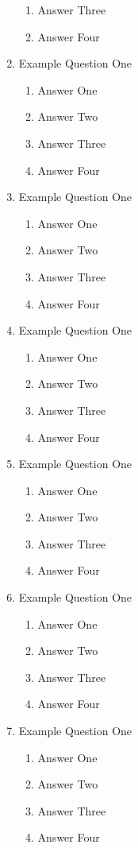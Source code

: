 \documentclass[11pt,fleqn]{article}
\begin{document}
\begin{enumerate}
\begin{enumerate}
	\item Answer Three
	\item Answer Four
	\end{enumerate}
\item Example Question One
	\begin{enumerate}
	\item Answer One
	\item Answer Two
	\item Answer Three
	\item Answer Four
	\end{enumerate}
\item Example Question One
	\begin{enumerate}
	\item Answer One
	\item Answer Two
	\item Answer Three
	\item Answer Four
	\end{enumerate}
\item Example Question One
	\begin{enumerate}
	\item Answer One
	\item Answer Two
	\item Answer Three
	\item Answer Four
	\end{enumerate}
\item Example Question One
	\begin{enumerate}
	\item Answer One
	\item Answer Two
	\item Answer Three
	\item Answer Four
	\end{enumerate}
\item Example Question One
	\begin{enumerate}
	\item Answer One
	\item Answer Two
	\item Answer Three
	\item Answer Four
	\end{enumerate}
\item Example Question One
	\begin{enumerate}
	\item Answer One
	\item Answer Two
	\item Answer Three
	\item Answer Four

\end{enumerate}
\end{enumerate}
\end{document}
